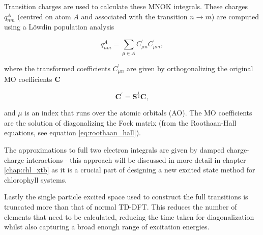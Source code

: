 Transition charges are used to calculate these MNOK integrals. These charges $q^A_{nm}$
(centred on atom $A$ and associated with the transition $ n \rightarrow m$) are
computed using a Löwdin population analysis

\begin{equation}
q_{nm}^A = \sum_{\mu \in A} C^\prime_{\mu n} C^\prime_{\mu m},
\end{equation}

where the transformed coefficients $C^\prime_{\mu n}$ are given by orthogonalizing
the original MO coefficients $\textbf{C}$

\begin{equation}
\textbf{C}^\prime = \textbf{S}^{\frac{1}{2}} \textbf{C},
\end{equation}

and $\mu$ is an index that runs over the atomic orbitals (AO). The MO coefficients
are the solution of diagonalizing the Fock matrix (from the Roothaan-Hall equations,
see equation \ref{eq:roothaan_hall}).

The approximations to full two electron integrals are given by damped charge-charge
interactions - this approach will be discussed in more detail in chapter \ref{chap:chl_xtb}
as it is a crucial part of designing a new excited state method for chlorophyll systems. 

Lastly the single particle excited space used to construct the full transitions
is truncated more than that of normal TD-DFT. This reduces the number of elements
that need to be calculated, reducing the time taken for diagonalization whilst also
capturing a broad enough range of excitation energies. 

